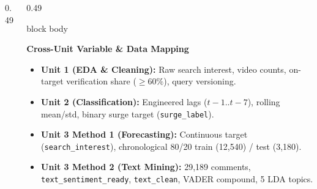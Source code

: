 \documentclass[aspectratio=169, 10pt]{beamer}
\newenvironment{card}[1][]{%
        \begin{beamercolorbox}[rounded=true,shadow=false,wd=\linewidth,sep=3.5pt,#1]{block body}%
        \fontsize{7.8pt}{9.8pt}\selectfont%
    }{%
        \end{beamercolorbox}%
    }
\begin{document}
\begin{frame}[t]
\begin{columns}[T]
\begin{column}{0.49\textwidth}
            \end{column}                                                                                                                                                                               
                                                                                                                                                                                                       
            \begin{column}{0.49\textwidth}                                                                                                                                                             
                \begin{card}                                                                                                                                                                           
                    \textbf{\color{NavyPrimary}Cross-Unit Variable \& Data Mapping}\\[0.03cm]                                                                                                          
                    \begin{itemize}\setlength{\itemsep}{1.2pt}                                                                                                                                         
                        \item \textbf{Unit 1 (EDA \& Cleaning):} Raw search interest, video counts, on-target verification share ($\ge 60\%$), query versioning.                                       
                        \item \textbf{Unit 2 (Classification):} Engineered lags ($t-1..t-7$), rolling mean/std, binary surge target (\texttt{surge\_label}).                                           
                        \item \textbf{Unit 3 Method 1 (Forecasting):} Continuous target (\texttt{search\_interest}), chronological 80/20 train (12,540) / test (3,180).                                
                        \item \textbf{Unit 3 Method 2 (Text Mining):} 29,189 comments, \texttt{text\_sentiment\_ready}, \texttt{text\_clean}, VADER compound, 5 LDA topics.                            
                    \end{itemize}                                                                                                                                                                      

\end{card}
\end{column}
\end{columns}
\end{frame}
\end{document}
